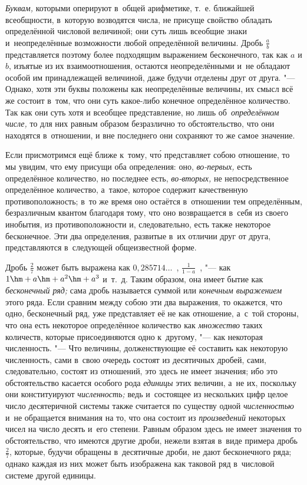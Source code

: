 {\em Буквам,} которыми оперируют в~общей арифметике, т.~е. ближайшей
всеобщности, в~которую возводятся числа, не присуще свойство обладать
определённой числовой величиной; они суть лишь всеобщие знаки и~неопределённые
возможности любой определённой величины. Дробь $\frac a b$ представляется
поэтому более подходящим выражением бесконечного, так как $a$ и $b$,
изъятые из их взаимоотношения, остаются неопределёнными и~не обладают особой им
принадлежащей величиной, даже будучи отделены друг от друга. "--- Однако, хотя
эти буквы положены как неопределённые величины, их смысл всё же состоит в~том,
что они суть какое-либо конечное определённое количество. Так как они суть хотя
и всеобщее представление, но лишь об~{\em определённом числе,} то для них
равным образом безразлично то обстоятельство, что они находятся в~отношении,
и вне последнего они сохраняют то же самое значение.

Если присмотримся ещё ближе к~тому, чт\'{о} представляет собою отношение, то мы
увидим, что ему присущи оба определения: оно, {\em во-первых,} есть
определённое количество, но последнее есть, {\em во-вторых,} не
непосредственное определённое количество, а~такое, которое содержит качественную
противоположность; в~то же время оно остаётся в~отношении тем определённым,
безразличным квантом благодаря тому, что оно возвращается в~себя из
своего инобытия, из противоположности и, следовательно, есть также
некоторое бесконечное. Эти два определения, развитые в~их отличии друг от
друга, представляются в~следующей общеизвестной форме.

Дробь $\frac 2 7$ может быть выражена как $0{,}285714\ldots$~,
$\frac 1{1-a}$~, "--- как $1\hm+a\hm+a^2\hm+a^3$ и~т.~д. Таким образом, она
имеет бытие как {\em бесконечный ряд;} сама дробь называется суммой
или {\em конечным выражением} этого ряда. Если сравним между собою эти два
выражения, то окажется, что одно, бесконечный ряд, уже представляет её не как
отношение, а~с~той стороны, что она есть некоторое определённое количество как
{\em множество} таких количеств, которые присоединяются одно к~другому, "---
как некоторая численность. "--- Что величины, долженствующие её составить как
некоторую численность, сами в~свою очередь состоят из десятичных дробей, сами,
следовательно, состоят из отношений, это здесь не имеет значения; ибо это
обстоятельство касается особого рода {\em единицы} этих величин, а~не их,
поскольку они конституируют {\em численность;} ведь и~состоящее из нескольких
цифр целое число десятеричной системы также считается по существу одной
{\em численностью} и~не обращается внимания на то, что она состоит из
{\em произведений} некоторых чисел на число десять и~его степени. Равным
образом здесь не имеет значения то обстоятельство, что имеются другие дроби,
нежели взятая в~виде примера дробь $\frac 2 7$, которые, будучи обращены
в~десятичные дроби, не дают бесконечного ряда; однако каждая из них может быть
изображена как таковой ряд в~числовой системе другой единицы.

